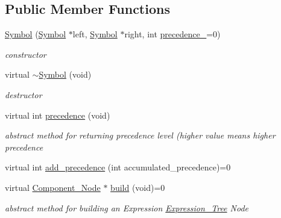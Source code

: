 \subsection*{Public Member Functions}
\begin{DoxyCompactItemize}
\item 
\hyperlink{classMadara_1_1Expression__Tree_1_1Symbol_a7bd7d2890a1cbf057758cb5d9abe7da2}{Symbol} (\hyperlink{classMadara_1_1Expression__Tree_1_1Symbol}{Symbol} $\ast$left, \hyperlink{classMadara_1_1Expression__Tree_1_1Symbol}{Symbol} $\ast$right, int \hyperlink{classMadara_1_1Expression__Tree_1_1Symbol_a2de31139261eea47dccd48d377780803}{precedence\_\-}=0)
\begin{DoxyCompactList}\small\item\em constructor \item\end{DoxyCompactList}\item 
virtual \hyperlink{classMadara_1_1Expression__Tree_1_1Symbol_a66d8f860f7c17b3c2c1497ec82ed8bb7}{$\sim$Symbol} (void)
\begin{DoxyCompactList}\small\item\em destructor \item\end{DoxyCompactList}\item 
virtual int \hyperlink{classMadara_1_1Expression__Tree_1_1Symbol_ac060dedb8d16864591b259df375109b3}{precedence} (void)
\begin{DoxyCompactList}\small\item\em abstract method for returning precedence level (higher value means higher precedence \item\end{DoxyCompactList}\item 
virtual int \hyperlink{classMadara_1_1Expression__Tree_1_1Symbol_ae16afabe3c5f9ba32d06386eb02e7e0c}{add\_\-precedence} (int accumulated\_\-precedence)=0
\item 
virtual \hyperlink{classMadara_1_1Expression__Tree_1_1Component__Node}{Component\_\-Node} $\ast$ \hyperlink{classMadara_1_1Expression__Tree_1_1Symbol_a01fdf1d8b06b3d6e49027d35b761cce4}{build} (void)=0
\begin{DoxyCompactList}\small\item\em abstract method for building an Expression \hyperlink{classMadara_1_1Expression__Tree_1_1Expression__Tree}{Expression\_\-Tree} Node \item\end{DoxyCompactList}\end{DoxyCompactItemize}
